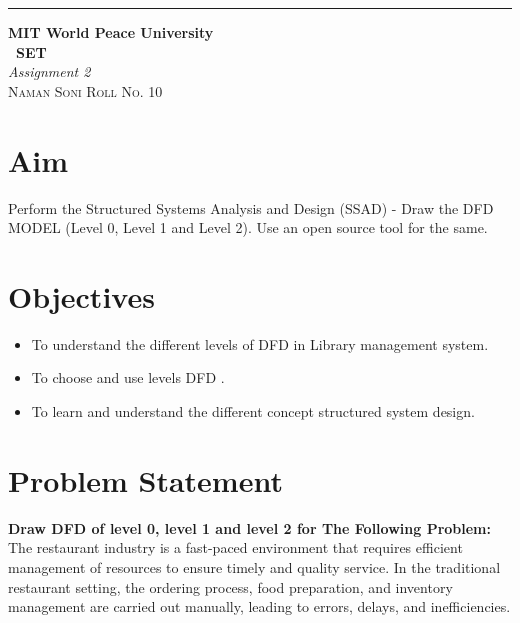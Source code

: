\documentclass{article}
\begin{document}
\begin{titlepage} %
	
	\raggedleft\rule{1pt}{\textheight} %
	\hspace{0.05\textwidth} %
	\parbox[b]{0.75\textwidth}
	{ %
		
		{\Huge\bfseries MIT World Peace University \\[0.5\baselineskip] \ SET}\\[2\baselineskip] %
		{\large\textit{Assignment 2}}\\[4\baselineskip] %
		{\Large\textsc{Naman Soni Roll No. 10}} %
		
		\vspace{0.5\textheight} %
	}
	
\end{titlepage}
\tableofcontents
\pagebreak
\section{\textbf{Aim}}
Perform the Structured Systems Analysis and Design (SSAD) - Draw the DFD MODEL (Level 0, Level 1 and Level 2). Use an open source tool for the same.
\section{\textbf{Objectives}}
\begin{itemize}
	\item To understand the different levels of DFD in Library management system.
	\item To choose and use levels DFD .
	\item To learn and understand the different concept structured system design.
\end{itemize}
\section{\textbf{Problem Statement}}
\textbf{Draw DFD of level 0, level 1 and level 2 for The Following Problem:}\\

The restaurant industry is a fast-paced environment that requires efficient management of resources to ensure timely and quality service. In the traditional restaurant setting, the ordering process, food preparation, and inventory management are carried out manually, leading to errors, delays, and inefficiencies.
\end{document}
